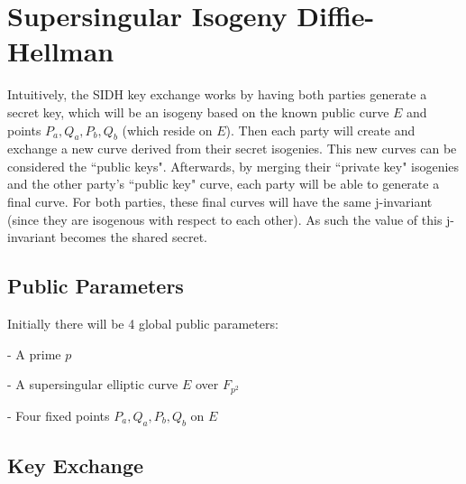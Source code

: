 \documentclass[10pt,twocolumn]{article} %
\begin{document}
\section{Supersingular Isogeny Diffie-Hellman}
Intuitively, the SIDH key exchange works by having both parties generate a secret key, which will be an isogeny based on the known public curve $E$ and points $P_a,Q_a,P_b,Q_b$ (which reside on $E$). Then each party will create and exchange a new curve derived from their secret isogenies. This new curves can be considered the ``public keys". Afterwards, by merging their ``private key" isogenies and the other party's ``public key" curve, each party will be able to generate a final curve. For both parties, these final curves will have the same j-invariant (since they are isogenous with respect to each other). As such the value of this j-invariant becomes the shared secret.



\subsection{Public Parameters}
Initially there will be 4 global public parameters:
\par - A prime $p$ 
\par - A supersingular elliptic curve $E$ over $F_{p^2}$
\par - Four fixed points $P_a,Q_a,P_b,Q_b$ on $E$ 


\subsection{Key Exchange}
\end{document}
